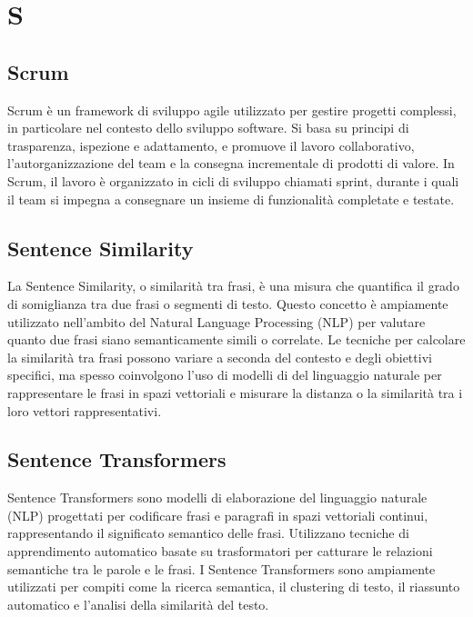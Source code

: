 \section{S}

\vspace{2em}
\subsection*{Scrum}
Scrum è un framework di sviluppo agile utilizzato per gestire progetti complessi, in particolare nel contesto dello sviluppo software. Si basa su principi di trasparenza, ispezione e adattamento, e promuove il lavoro collaborativo, l'autorganizzazione del team e la consegna incrementale di prodotti di valore. In Scrum, il lavoro è organizzato in cicli di sviluppo chiamati sprint, durante i quali il team si impegna a consegnare un insieme di funzionalità completate e testate. 

\vspace{2em}
\subsection*{Sentence Similarity}
La Sentence Similarity, o similarità tra frasi, è una misura che quantifica il grado di somiglianza tra due frasi o segmenti di testo. Questo concetto è ampiamente utilizzato nell'ambito del Natural Language Processing (NLP) per valutare quanto due frasi siano semanticamente simili o correlate. Le tecniche per calcolare la similarità tra frasi possono variare a seconda del contesto e degli obiettivi specifici, ma spesso coinvolgono l'uso di modelli di  del linguaggio naturale per rappresentare le frasi in spazi vettoriali e misurare la distanza o la similarità tra i loro vettori rappresentativi.

\vspace{2em}
\subsection*{Sentence Transformers}
Sentence Transformers sono modelli di elaborazione del linguaggio naturale (NLP) progettati per codificare frasi e paragrafi in spazi vettoriali continui, rappresentando il significato semantico delle frasi. Utilizzano tecniche di apprendimento automatico basate su trasformatori per catturare le relazioni semantiche tra le parole e le frasi. I Sentence Transformers sono ampiamente utilizzati per compiti come la ricerca semantica, il clustering di testo, il riassunto automatico e l'analisi della similarità del testo.

